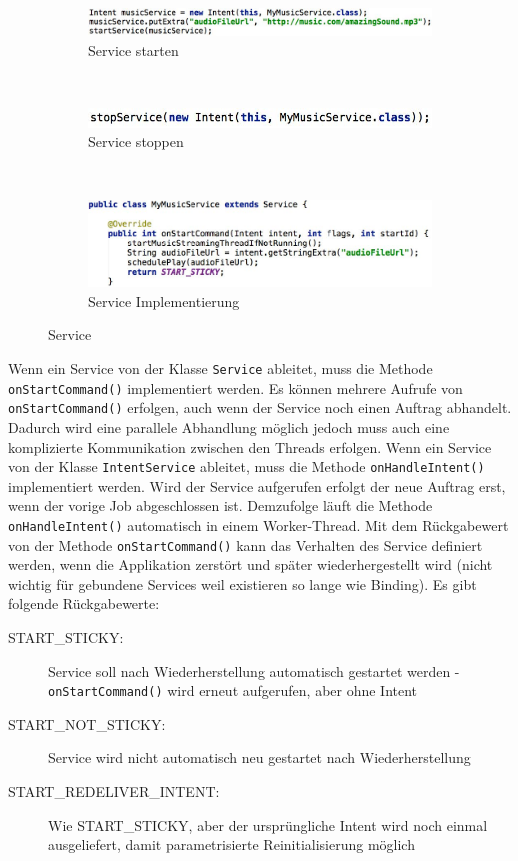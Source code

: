 \begin{figure}
	\centering
	\begin{subfigure}[b]{0.3\textwidth}
		\includegraphics[width=\textwidth]{fig/service-starten}
		\caption{Service starten}
	\end{subfigure}
	~
	\begin{subfigure}[b]{0.3\textwidth}
		\includegraphics[width=\textwidth]{fig/service-stoppen}
		\caption{Service stoppen}
	\end{subfigure}
	~
	\begin{subfigure}[b]{0.3\textwidth}
		\includegraphics[width=\textwidth]{fig/service-implementierung}
		\caption{Service Implementierung}
	\end{subfigure}
	\caption{Service}
	\label{fig:service}
\end{figure}

Wenn ein Service von der Klasse \texttt{Service} ableitet, muss die Methode \texttt{onStartCommand()} implementiert werden. Es können mehrere Aufrufe von \texttt{onStartCommand()} erfolgen, auch wenn der Service noch einen Auftrag abhandelt. Dadurch wird eine parallele Abhandlung möglich jedoch muss auch eine komplizierte Kommunikation zwischen den Threads erfolgen.
Wenn ein Service von der Klasse \texttt{IntentService} ableitet, muss die Methode \texttt{onHandleIntent()} implementiert werden. Wird der Service aufgerufen erfolgt der neue Auftrag erst, wenn der vorige Job abgeschlossen ist. Demzufolge läuft die Methode \texttt{onHandleIntent()} automatisch in einem Worker-Thread.
Mit dem Rückgabewert von der Methode \texttt{onStartCommand()} kann das Verhalten des Service definiert werden, wenn die Applikation zerstört und später wiederhergestellt wird (nicht wichtig für gebundene Services weil existieren so lange wie Binding). Es gibt folgende Rückgabewerte:
\begin{description}
	\item[START\_STICKY:] Service soll nach Wiederherstellung automatisch gestartet werden - \texttt{onStartCommand()} wird erneut aufgerufen, aber ohne Intent
	\item[START\_NOT\_STICKY:] Service wird nicht automatisch neu gestartet nach Wiederherstellung
	\item[START\_REDELIVER\_INTENT:] Wie START\_STICKY, aber der ursprüngliche Intent wird noch einmal ausgeliefert, damit parametrisierte Reinitialisierung möglich
\end{description}

